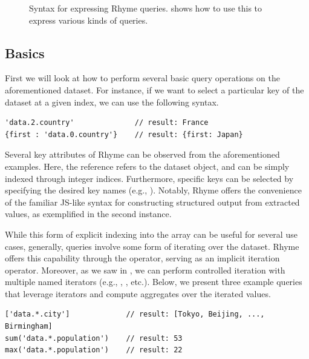 \documentclass[runningheads]{llncs}
\newcommand{\lang}{Rhyme}
\begin{document}
\begin{figure}[t!]
\caption{Syntax for expressing \lang{} queries.  shows how to use this to express
various kinds of queries. }\label{fig:grammar}
\vspace{-5mm}
\end{figure}



\vspace{-4mm}
\subsection{Basics}
\vspace{-2mm}
First we will look at how to perform several basic query operations on the
aforementioned dataset.
For instance, if we want to select a particular key of the dataset at a given
index, we can use the following syntax.

\begin{lstlisting}[style=JavaScript]
'data.2.country'              // result: France
{first : 'data.0.country'}    // result: {first: Japan}
\end{lstlisting}

Several key attributes of \lang{} can be observed from the aforementioned examples.
Here, the reference  refers to
the dataset object, 
and can be simply indexed through integer indices.
Furthermore, specific keys can be selected by specifying the desired
key names (e.g., ).
Notably, \lang{} offers the convenience of the familiar JS-like syntax for constructing
structured output from extracted values, as exemplified in the second instance.

While this form of explicit indexing into the array can be useful for several
use cases, generally, queries involve some form of iterating over the dataset.
\lang{} offers this capability through the \inline{*} operator,
serving as an implicit iteration operator.
Moreover, as we saw in , we can perform controlled iteration with multiple
named iterators (e.g., , , etc.).
Below, we present three example queries that leverage iterators and compute
aggregates over the iterated values.

\begin{lstlisting}[style=JavaScript, columns=flexible]
['data.*.city']             // result: [Tokyo, Beijing, ..., Birmingham]
sum('data.*.population')    // result: 53
max('data.*.population')    // result: 22
\end{lstlisting}
\end{document}
